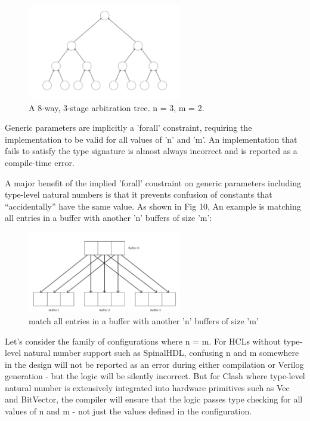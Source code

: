 \documentclass{article}
\begin{document}
\begin{figure}
\centering
\includegraphics[width=0.6\textwidth]{Frame_1(6).png}
\caption{\label{fig:frame6}A 8-way, 3-stage arbitration tree. n = 3, m = 2.}
\end{figure}

Generic parameters are implicitly a 'forall' constraint, requiring the implementation to be valid for all values of 'n' and 'm'. An implementation that fails to satisfy the type signature is almost always incorrect and is reported as a compile-time error.

A major benefit of the implied 'forall' constraint on generic parameters including type-level natural numbers is that it prevents confusion of constants that “accidentally” have the same value. As shown in Fig 10, An example is matching all entries in a buffer with another 'n' buffers of size 'm':

\begin{figure}[hbt]
\centering
\includegraphics[width=0.6\textwidth]{Frame_1(5).png}
\caption{\label{fig:frame6}match all entries in a buffer with another 'n' buffers of size 'm'}
\end{figure}

Let’s consider the family of configurations where n = m. For HCLs without type-level natural number support such as SpinalHDL, confusing n and m somewhere in the design will not be reported as an error during either compilation or Verilog generation - but the logic will be silently incorrect. But for Clash where type-level natural number is extensively integrated into hardware primitives such as Vec and BitVector, the compiler will ensure that the logic passes type checking for all values of n and m - not just the values defined in the configuration.
\end{document}
